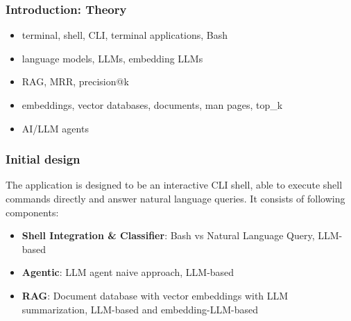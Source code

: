 \documentclass[10pt,aspectratio=169]{beamer}
\begin{document}
\begin{frame}
    \frametitle{Introduction: Theory}
    \begin{itemize}
        \large
        \item terminal, shell, CLI, terminal applications, Bash
        \item language models, LLMs, embedding LLMs
        \item RAG, MRR, precision@k
        \item embeddings, vector databases, documents, man pages, top\_k
        \item AI/LLM agents
    \end{itemize}
\end{frame}

\begin{frame}
    \frametitle{Initial design}
    The application is designed to be an interactive CLI shell, able to execute shell
    commands directly and answer natural language queries. It consists of
    following components:
    \begin{itemize}
        \item \textbf{Shell Integration \& Classifier}: Bash vs Natural Language Query, LLM-based
        \item \textbf{Agentic}: LLM agent naive approach, LLM-based
        \item \textbf{RAG}: Document database with vector embeddings with LLM
            summarization, LLM-based and embedding-LLM-based
    \end{itemize}
\end{frame}
\end{document}
